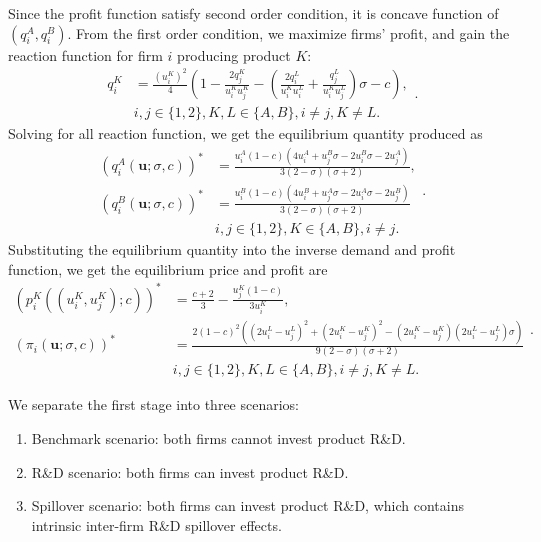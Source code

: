 \documentclass[12pt]{article}
\begin{document}
Since the profit function satisfy second order condition, it is concave function of $(q_i^A,q_i^B)$.
From the first order condition, we maximize firms' profit, and gain the reaction function for firm $i$ producing product $K$:
\begin{equation}
    \begin{aligned}
    q_i^K & = \frac{(u_i^K)^2}{4}  \left( 1 - \frac{2 q_j^K}{u_i^K u_j^K} - \left( \frac{2 q_i^L}{u_i^K u_i^L} + \frac{q_j^L}{u_i^K u_j^L} \right) \sigma - c \right),\\
    &  i, j \in \{ 1, 2 \}, K, L \in \{ A, B \}, i \neq j, K \neq L.
    \end{aligned}.
\end{equation}
Solving for all reaction function, we get the equilibrium quantity produced as 
\begin{equation}
  \begin{aligned}
    (q_i^A (\mathbf{u}; \sigma, c))^{\ast} & = \frac{u_i^A  (1 - c)  (4u_i^A + u_j^B \sigma - 2 u_i^B \sigma - 2 u_j^A)}{3 (2 - \sigma)  (\sigma + 2)},\\
    (q_i^B (\mathbf{u}; \sigma, c))^{\ast} & = \frac{u_i^B  (1 - c)  (4 u_i^B + u_j^A \sigma - 2 u_i^A \sigma - 2 u_j^B)}{3 (2 - \sigma)  (\sigma + 2)}\\
    &  i, j \in \{ 1, 2 \}, K \in \{ A, B \}, i \neq j.
\end{aligned}. 
\end{equation}
Substituting the equilibrium quantity into the inverse demand and profit function, we get the equilibrium price and profit are
\begin{equation}
    \begin{aligned}
    (p_i^K ((u_i^K, u_j^K) ; c))^{\ast} & = \frac{c + 2}{3} - \frac{u_j^K (1 - c)}{3 u_i^K},\\
    (\pi_i (\mathbf{u}; \sigma, c))^{\ast} & = \frac{2 (1 - c)^2  \left( (2u_i^L - u_j^L)^2 + (2 u_i^K - u_j^K)^2 - (2 u_i^K - u_j^K)  (2 u_i^L - u_j^L) \sigma \right)}{9 (2 - \sigma)  (\sigma + 2)}\\
    &  i, j \in \{ 1, 2 \}, K, L \in \{ A, B \}, i \neq j, K \neq L.
    \end{aligned}.
\end{equation}

We separate the first stage into three scenarios:
\begin{enumerate}
    \item Benchmark scenario: both firms cannot invest product R\&D.
    \item R\&D scenario: both firms can invest product R\&D.
    \item Spillover scenario: both firms can invest product R\&D, which contains intrinsic inter-firm R\&D spillover effects.
\end{enumerate}
\end{document}
